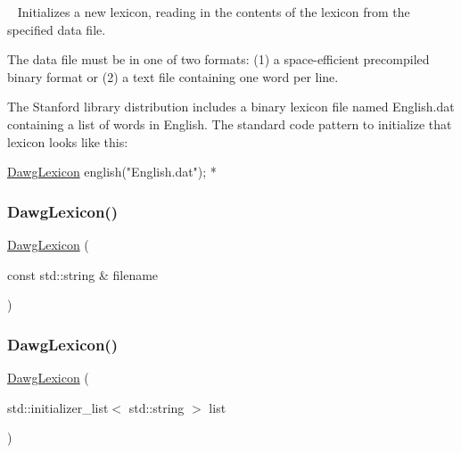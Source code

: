 ~\newline
 Initializes a new lexicon, reading in the contents of the lexicon from the specified data file. 

The data file must be in one of two formats\+: (1) a space-\/efficient precompiled binary format or (2) a text file containing one word per line.

The Stanford library distribution includes a binary lexicon file named {\ttfamily English.\+dat} containing a list of words in English. The standard code pattern to initialize that lexicon looks like this\+:


\begin{DoxyPre}
  \mbox{\hyperlink{classDawgLexicon}{DawgLexicon}} english("English.dat");
*\end{DoxyPre}
 \mbox{\label{classDawgLexicon_a2514881fb902166faf4b4a2c58128b7f}} 
\subsubsection{\texorpdfstring{Dawg\+Lexicon()}{DawgLexicon()}\hspace{0.1cm}{\footnotesize\ttfamily [3/5]}}
{\footnotesize\ttfamily \mbox{\hyperlink{classDawgLexicon}{Dawg\+Lexicon}} (\begin{DoxyParamCaption}\item[{const std\+::string \&}]{filename }\end{DoxyParamCaption})}

\mbox{\label{classDawgLexicon_ab482763811fb89cbf52d64bd789ffff1}} 
\subsubsection{\texorpdfstring{Dawg\+Lexicon()}{DawgLexicon()}\hspace{0.1cm}{\footnotesize\ttfamily [4/5]}}
{\footnotesize\ttfamily \mbox{\hyperlink{classDawgLexicon}{Dawg\+Lexicon}} (\begin{DoxyParamCaption}\item[{std\+::initializer\+\_\+list$<$ std\+::string $>$}]{list }\end{DoxyParamCaption})}

